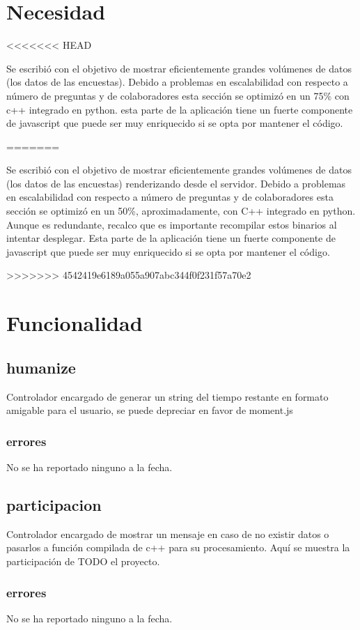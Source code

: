 \documentclass[10pt,a4paper]{book}
\begin{document}
	\section{Necesidad}
<<<<<<< HEAD

	Se escribió con el objetivo de mostrar eficientemente grandes volúmenes de datos (los datos de las encuestas). Debido a problemas en escalabilidad con respecto a número de preguntas y de colaboradores esta sección se optimizó en un 75\% con c++ integrado en python. esta parte de la aplicación tiene un fuerte componente de javascript que puede ser muy enriquecido si se opta por mantener el código.

=======
	
	Se escribió con el objetivo de mostrar eficientemente grandes volúmenes de datos (los datos de las encuestas) renderizando desde el servidor. Debido a problemas en escalabilidad con respecto a número de preguntas y de colaboradores esta sección se optimizó en un 50\%, aproximadamente, con C++ integrado en python. Aunque es redundante, recalco que es importante recompilar estos binarios al intentar desplegar. Esta parte de la aplicación tiene un fuerte componente de javascript que puede ser muy enriquecido si se opta por mantener el código.
	
>>>>>>> 4542419e6189a055a907abc344f0f231f57a70e2
	\section{Funcionalidad}


	\subsection{humanize}
	Controlador encargado de generar un string del tiempo restante en formato amigable para el usuario, se puede depreciar en favor de moment.js
	\subsubsection{errores}
	No se ha reportado ninguno a la fecha.

	\subsection{participacion}
	Controlador encargado de mostrar un mensaje en caso de no existir datos o pasarlos a función compilada de c++ para su procesamiento. Aquí se muestra la participación de TODO el proyecto.
	\subsubsection{errores}
	No se ha reportado ninguno a la fecha.
\end{document}
